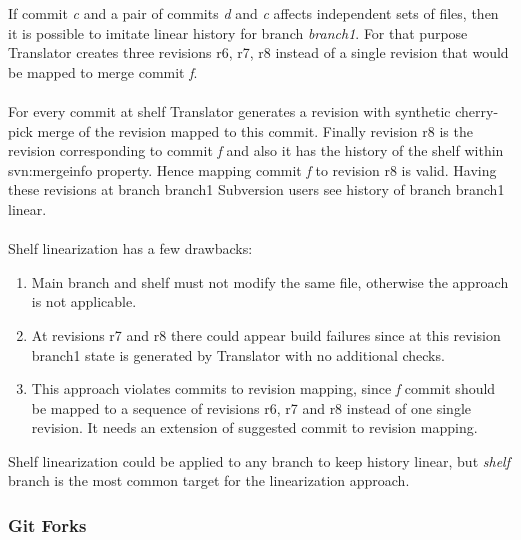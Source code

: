 If commit \emph{c} and a pair of commits \emph{d} and \emph{c} affects independent sets of files, 
then it is possible to imitate linear history for branch \emph{branch1}. 
For that purpose Translator creates three revisions r6, r7, r8 instead of a single revision that would be mapped to merge commit \emph{f}.
\\\\
For every commit at shelf Translator generates a revision with synthetic cherry-pick merge of the revision mapped to this commit. Finally revision r8 is the revision corresponding to commit \emph{f} and also it has the history of the shelf within svn:mergeinfo property. Hence mapping commit \emph{f} to revision r8 is valid. Having these revisions at branch branch1 Subversion users see history of branch branch1 linear.
\\\\
Shelf linearization has a few drawbacks:
\begin{enumerate}
\compactlist
	\item Main branch and shelf must not modify the same file, otherwise the approach is not applicable.
	\item At revisions r7 and r8 there could appear build failures since at this revision branch1 state is generated by Translator with no additional checks.
	\item This approach violates commits to revision mapping, since \emph{f} commit should be mapped to a sequence of revisions r6, r7 and r8 instead of one single revision. It needs an extension of suggested commit to revision mapping. 
\end{enumerate}

Shelf linearization could be applied to any branch to keep history linear, but \emph{shelf} branch is the most common target
for the linearization approach.

\subsubsection{Git Forks}

